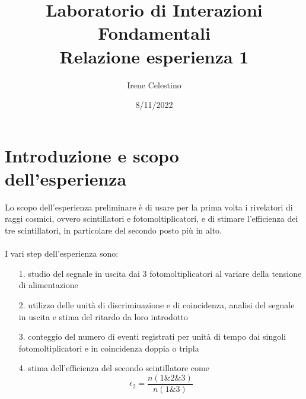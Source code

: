 \documentclass{article}
\title{Laboratorio di Interazioni Fondamentali \\ Relazione esperienza 1}
\author{Irene Celestino}
\date{8/11/2022}
\begin{document}
\maketitle

\section{Introduzione e scopo dell'esperienza}
Lo scopo dell'esperienza preliminare è di usare per la prima volta i rivelatori di raggi cosmici, ovvero scintillatori e fotomoltiplicatori, e di stimare l'efficienza dei tre scintillatori, in particolare del secondo posto più in alto. 
\\
\\
I vari step dell'esperienza sono: 
\begin{itemize}
    \item [1.] studio del segnale in uscita dai 3 fotomoltiplicatori al variare della tensione di alimentazione
    \item [2.] utilizzo delle unità di discriminazione e di coincidenza, analisi del segnale in uscita e stima del ritardo da loro introdotto 
    \item [3.] conteggio del numero di eventi registrati per unità di tempo dai singoli fotomoltiplicatori e in coincidenza doppia o tripla
    \item [4.] stima dell'efficienza del secondo scintillatore come $$\epsilon_2 = \frac{n(1\&2\&3)}{n(1\&3)}$$
\end{itemize}
\end{document}

